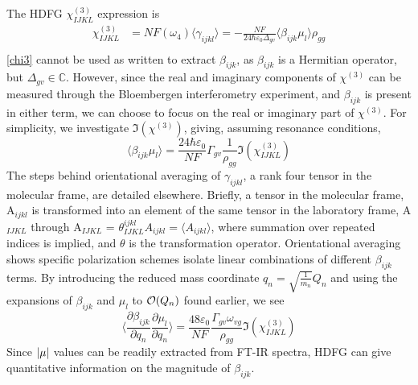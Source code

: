 \documentclass[aip, jcp, reprint, onecolumn]{revtex4-2}
\begin{document}
The HDFG $\chi^{(3)}_{IJKL}$ expression is
\begin{equation}\label{chi3}
\begin{split}
		\chi^{(3)}_{IJKL} &= NF(\omega_4) \langle \gamma_{ijkl} \rangle = -\frac{NF}{24 \hbar \varepsilon_0 \Delta_{gv}} \langle \beta_{ijk} \mu_l \rangle \rho_{gg}\\
\end{split}
\end{equation}
\autoref{chi3} cannot be used as written to extract $\beta_{ijk}$, as $\beta_{ijk}$ is a Hermitian operator, but $\Delta_{gv} \in \mathbb{C}$. 
However, since the real and imaginary components of $\chi^{(3)}$ can be measured through the Bloembergen interferometry experiment, and $\beta_{ijk}$ is present in either term, we can choose to focus on the real or imaginary part of $\chi^{(3)}$.
For simplicity, we investigate $\Im(\chi^{(3)})$, giving, assuming resonance conditions, 
\begin{equation}
	\langle \beta_{ijk} \mu_{l} \rangle = \frac{24 \hbar \varepsilon_0}{NF} \Gamma_{gv} \frac{1}{\rho_{gg}} \Im(\chi^{(3)}_{IJKL})
\end{equation}
The steps behind orientational averaging of $\gamma_{ijkl}$, a rank four tensor in the molecular frame, are detailed elsewhere.\cite{Andrews1977, McDonnell2024}
Briefly, a tensor in the molecular frame, A$_{ijkl}$ is transformed into an element of the same tensor in the laboratory frame, A$_{IJKL}$ through A$_{IJKL}$ = $\theta^{ijkl}_{IJKL} A_{ijkl} = \langle A_{ijkl} \rangle$, where summation over repeated indices is implied, and $\theta$ is the transformation operator. \cite{McDonnell2024}
Orientational averaging shows specific polarization schemes isolate linear combinations of different $\beta_{ijk}$ terms. \cite{Cyvin1965, Bersohn1966, Kauranen1996}
By introducing the reduced mass coordinate $q_n = \sqrt{\frac{1}{m_n}} Q_n$ and using the expansions of $\beta_{ijk}$ and $\mu_{l}$ to $\order{Q_n}$ found earlier, we see
\begin{equation}\label{betasive}
	\langle \frac{\partial \beta_{ijk}}{\partial q_n} {\frac{\partial \mu_l}{\partial q_n}} \rangle = \frac{48 \varepsilon_0}{NF}  \frac{\Gamma_{gv} \omega_{vg}}{\rho_{gg}} {\Im(\chi^{(3)}_{IJKL})}
\end{equation}
Since $\abs{\mu}$ values can be readily extracted from FT-IR spectra,\cite{RN109, RN412} HDFG can give quantitative information on the magnitude of $\beta_{ijk}$.
\end{document}
